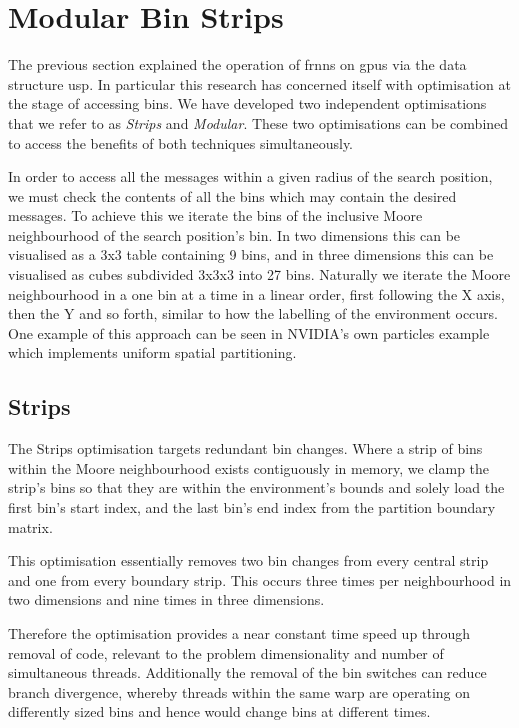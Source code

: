 \section{Modular Bin Strips\label{sec:innovation}}
  The previous section explained the operation of \gls{frnns} on \glspl{gpu} via the data structure \gls{usp}. In particular this research has concerned itself with optimisation at the stage of accessing bins. We have developed two independent optimisations that we refer to as \textit{Strips} and \textit{Modular}. These two optimisations can be combined to access the benefits of both techniques simultaneously.
  
  
  In order to access all the messages within a given radius of the search position, we must check the contents of all the bins which may contain the desired messages. To achieve this we iterate the bins of the inclusive Moore neighbourhood of the search position's bin. In two dimensions this can be visualised as a 3x3 table containing 9 bins, and in three dimensions this can be visualised as cubes subdivided 3x3x3 into 27 bins. Naturally we iterate the Moore neighbourhood in a one bin at a time in a linear order, first following the X axis, then the Y and so forth, similar to how the labelling of the environment occurs. One example of this approach can be seen in NVIDIA's own particles example which implements uniform spatial partitioning.
  \subsection{Strips}
    The Strips optimisation targets redundant bin changes. Where a strip of bins within the Moore neighbourhood exists contiguously in memory, we clamp the strip's bins so that they are within the environment's bounds and  solely load the first bin's start index, and the last bin's end index from the partition boundary matrix.
    
    This optimisation essentially removes two bin changes from every central strip and one from every boundary strip. This occurs three times per neighbourhood in two dimensions and nine times in three dimensions. 
    
    Therefore the optimisation provides a near constant time speed up through removal of code, relevant to the problem dimensionality and number of simultaneous threads. Additionally the removal of the bin switches can reduce branch divergence, whereby threads within the same warp are operating on differently sized bins and hence would change bins at different times.
    
